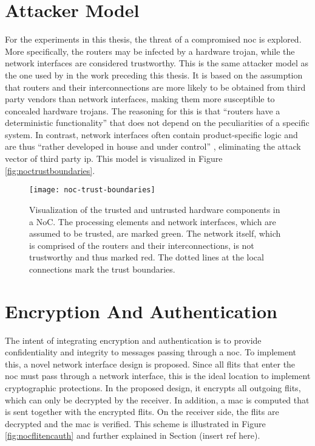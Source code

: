 \section{Attacker Model}
For the experiments in this thesis, the threat of a compromised \gls{noc} is explored. More specifically, the routers may be infected by a hardware
trojan, while the network interfaces are considered trustworthy. This is the same attacker model as the one used by \citeauthor{moriam18activeattackers}
\cite{moriam18activeattackers} in the work preceding this thesis. It is based on the assumption that routers and their interconnections are
more likely to be obtained from third party vendors than network interfaces, making them more susceptible to concealed hardware trojans. The reasoning
for this is that \enquote{routers have a deterministic functionality} \cite[2]{moriam18activeattackers} that does not depend on the peculiarities of
a specific system. In contrast, network interfaces often contain product-specific logic and are thus \enquote{rather developed in house and under
control} \cite[2]{moriam18activeattackers}, eliminating the attack vector of third party \gls{ip}. This model is visualized in Figure
\vref{fig:noctrustboundaries}.

\begin{figure}
    \centering
    \texttt{[image: noc-trust-boundaries]}
    \caption[Trust boundaries in a NoC]{Visualization of the trusted and untrusted hardware components in a NoC. The processing elements and network
    interfaces, which are assumed to be trusted, are marked green. The network itself, which is comprised of the routers and their interconnections,
    is not trustworthy and thus marked red. The dotted lines at the local connections mark the trust boundaries.}
    \label{fig:noctrustboundaries}
\end{figure}

\section{Encryption And Authentication}
The intent of integrating encryption and authentication is to provide confidentiality and integrity to messages passing through a \gls{noc}. To
implement this, a novel network interface design is proposed. Since all flits that enter the \gls{noc} must pass through a network interface, this is the
ideal location to implement cryptographic protections. In the proposed design, it encrypts all outgoing flits, which can only be decrypted by the
receiver. In addition, a \gls{mac} is computed that is sent together with the encrypted flits. On the receiver side, the flits are decrypted and the
\gls{mac} is verified. This scheme is illustrated in Figure \vref{fig:nocflitencauth} and further explained in Section (insert ref here).

